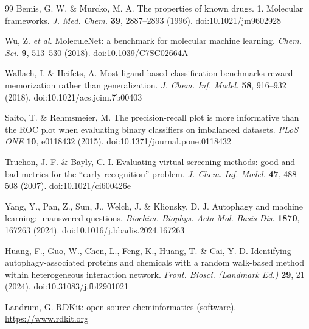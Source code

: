 \documentclass[11pt]{article}
\begin{document}
\begin{thebibliography}{99}
Bemis, G. W. \& Murcko, M. A. The properties of known drugs. 1. Molecular
frameworks. \textit{J. Med. Chem.} \textbf{39}, 2887--2893 (1996).
doi:10.1021/jm9602928

Wu, Z. \textit{et al.} MoleculeNet: a benchmark for molecular machine
learning. \textit{Chem. Sci.} \textbf{9}, 513--530 (2018).
doi:10.1039/C7SC02664A

Wallach, I. \& Heifets, A. Most ligand-based classification benchmarks reward
memorization rather than generalization. \textit{J. Chem. Inf. Model.}
\textbf{58}, 916--932 (2018). doi:10.1021/acs.jcim.7b00403

Saito, T. \& Rehmsmeier, M. The precision-recall plot is more informative than
the ROC plot when evaluating binary classifiers on imbalanced datasets.
\textit{PLoS ONE} \textbf{10}, e0118432 (2015).
doi:10.1371/journal.pone.0118432

Truchon, J.-F. \& Bayly, C. I. Evaluating virtual screening methods: good and
bad metrics for the ``early recognition'' problem. \textit{J. Chem. Inf.
Model.} \textbf{47}, 488--508 (2007). doi:10.1021/ci600426e

Yang, Y., Pan, Z., Sun, J., Welch, J. \& Klionsky, D. J. Autophagy and machine
learning: unanswered questions. \textit{Biochim. Biophys. Acta Mol. Basis
Dis.} \textbf{1870}, 167263 (2024). doi:10.1016/j.bbadis.2024.167263

Huang, F., Guo, W., Chen, L., Feng, K., Huang, T. \& Cai, Y.-D. Identifying
autophagy-associated proteins and chemicals with a random walk-based method
within heterogeneous interaction network. \textit{Front. Biosci. (Landmark
Ed.)} \textbf{29}, 21 (2024). doi:10.31083/j.fbl2901021

Landrum, G. RDKit: open-source cheminformatics (software).
\url{https://www.rdkit.org}

\end{thebibliography}
\end{document}
